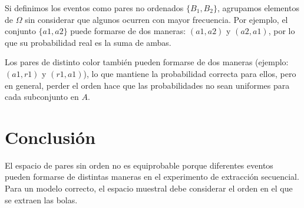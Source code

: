 \documentclass{article}
\begin{document}
	Si definimos los eventos como pares no ordenados \( \{B_1, B_2\} \), agrupamos elementos de \( \Omega \) sin considerar que algunos ocurren con mayor frecuencia. Por ejemplo, el conjunto \( \{a1, a2\} \) puede formarse de dos maneras: \((a1, a2)\) y \((a2, a1)\), por lo que su probabilidad real es la suma de ambas.
	
	Los pares de distinto color también pueden formarse de dos maneras (ejemplo: \((a1, r1)\) y \((r1, a1)\)), lo que mantiene la probabilidad correcta para ellos, pero en general, perder el orden hace que las probabilidades no sean uniformes para cada subconjunto en \( A \).
	
	\section{Conclusión}
	
	El espacio de pares sin orden no es equiprobable porque diferentes eventos pueden formarse de distintas maneras en el experimento de extracción secuencial. Para un modelo correcto, el espacio muestral debe considerar el orden en el que se extraen las bolas.
	
\end{document}
